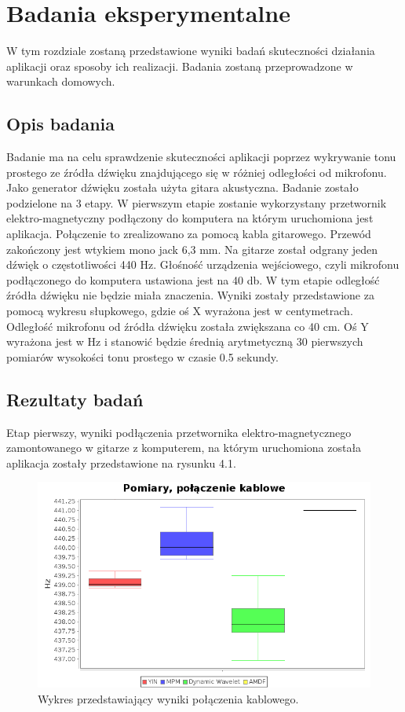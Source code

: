 \chapter{Badania eksperymentalne}
\label{chapter:rezultaty}
\thispagestyle{empty}

W tym rozdziale zostaną przedstawione wyniki badań skuteczności działania aplikacji oraz sposoby ich realizacji. Badania zostaną przeprowadzone w warunkach domowych.

\section{Opis badania}

Badanie ma na celu sprawdzenie skuteczności aplikacji poprzez wykrywanie tonu prostego ze źródła dźwięku znajdującego się w różniej odległości od mikrofonu. Jako generator dźwięku została użyta gitara akustyczna. Badanie zostało podzielone na 3 etapy. W pierwszym etapie zostanie wykorzystany przetwornik elektro-magnetyczny podłączony do komputera na którym uruchomiona jest aplikacja. Połączenie to zrealizowano za pomocą kabla gitarowego. Przewód zakończony jest wtykiem mono jack 6,3 mm. Na gitarze został odgrany jeden dźwięk o częstotliwości 440 Hz. Głośność urządzenia wejściowego, czyli mikrofonu podłączonego do komputera ustawiona jest na 40 db. W tym etapie odległość źródła dźwięku nie będzie miała znaczenia. Wyniki zostały przedstawione za pomocą wykresu słupkowego, gdzie oś X wyrażona jest w centymetrach. Odległość mikrofonu od źródła dźwięku została zwiększana co 40 cm. Oś Y wyrażona jest w  Hz i stanowić będzie średnią arytmetyczną 30 pierwszych pomiarów wysokości tonu prostego w czasie 0.5 sekundy. 

\section{Rezultaty badań}

Etap pierwszy, wyniki podłączenia przetwornika elektro-magnetycznego zamontowanego w gitarze z komputerem, na którym uruchomiona została aplikacja zostały przedstawione na rysunku 4.1.


\begin{figure}[h!]
  \centering
  \includegraphics[width=0.5\linewidth]{rys/BoxPlots/kabel}
  \caption{Wykres przedstawiający wyniki połączenia kablowego.}
  \label{fig:schemat}
\end{figure}






